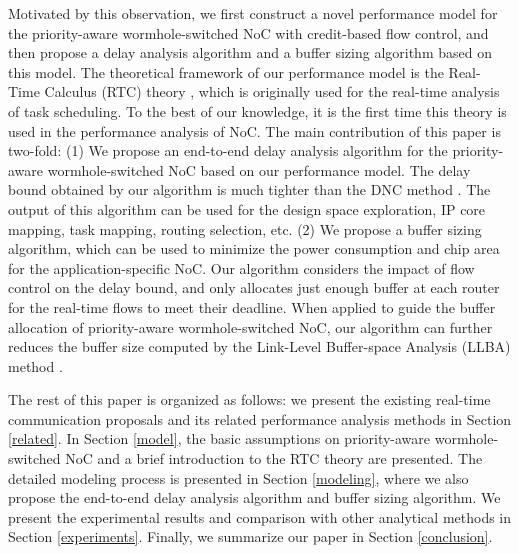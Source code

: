 \documentclass[10pt,journal]{IEEEtran}
\begin{document}
Motivated by this observation, we first construct a novel performance model for the priority-aware wormhole-switched NoC with credit-based flow control, and then propose a delay analysis algorithm and a buffer sizing algorithm based on this model. The theoretical framework of our performance model is the Real-Time Calculus (RTC) theory \cite{1253607}, which is originally used for the real-time analysis of task scheduling. To the best of our knowledge, it is the first time this theory is used in the performance analysis of NoC. The main contribution of this paper is two-fold: (1) We propose an end-to-end delay analysis algorithm for the priority-aware wormhole-switched NoC based on our performance model. The delay bound obtained by our algorithm is much tighter than the DNC method \cite{Qian489900}. The output of this algorithm can be used for the design space exploration, IP core mapping, task mapping, routing selection, etc. (2) We propose a buffer sizing algorithm, which can be used to minimize the power consumption and chip area for the application-specific NoC. Our algorithm considers the impact of flow control on the delay bound, and only allocates just enough buffer at each router for the real-time flows to meet their deadline. When applied to guide the buffer allocation of priority-aware wormhole-switched NoC, our algorithm can further reduces the buffer size computed by the Link-Level Buffer-space Analysis (LLBA) method \cite{189}.

The rest of this paper is organized as follows: we present the existing real-time communication proposals and its related performance analysis methods in Section \ref{related}. In Section \ref{model}, the basic assumptions on priority-aware wormhole-switched NoC and a brief introduction to the RTC theory are presented. The detailed modeling process is presented in Section \ref{modeling}, where we also propose the end-to-end delay analysis algorithm and buffer sizing algorithm. We present the experimental results and comparison with other analytical methods in Section \ref{experiments}. Finally, we summarize our paper in Section \ref{conclusion}.
\end{document}
